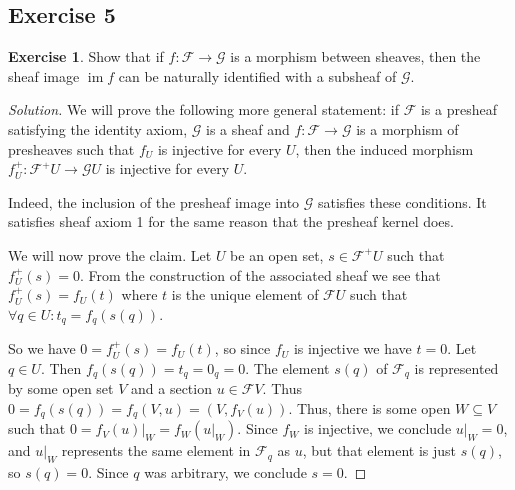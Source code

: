 \documentclass[a4paper]{amsbook}
\theoremstyle{definition}
\newtheorem*{exercise*}{Exercise}
\DeclareMathOperator\im{im}
\begin{document}
\subsection*{Exercise 5}
\label{Ex5}
\begin{exercise*}
\label{Exercise5}
Show that if $f\colon \mathcal{F}\to \mathcal{G}$ is a morphism between sheaves,
then the sheaf image $\im f$ can be naturally identified with a subsheaf of
$\mathcal{G}$.
\end{exercise*}
\begin{proof}[Solution]
We will prove the following more general statement: if $\mathcal{F}$ is a presheaf
satisfying the identity axiom, $\mathcal{G}$ is a sheaf and $f\colon \mathcal{F}\to \mathcal{G}$
is a morphism of presheaves such that $f_U$ is injective for every $U$, then the induced
morphism $f^+_U\colon \mathcal{F}^+U\to \mathcal{G}U$ is injective for every $U$.

Indeed, the inclusion of the presheaf image into $\mathcal{G}$ satisfies these conditions.
It satisfies sheaf axiom 1 for the same reason that the presheaf kernel does.

We will now prove the claim. Let $U$ be an open set, $s \in \mathcal{F}^+U$ such that
$f^+_U(s) = 0$. From the construction of the associated sheaf we see that
$f^+_U(s) = f_U(t)$ where $t$ is the unique element of $\mathcal{F}U$ such that
$\forall q \in U\colon t_q = f_q(s(q))$.

So we have $0 = f^+_U(s) = f_U(t)$, so since $f_U$ is injective we have $t = 0$.
Let $q \in U$. Then $f_q(s(q)) = t_q = 0_q = 0$. The element $s(q)$ of $\mathcal{F}_q$
is represented by some open set $V$ and a section $u \in \mathcal{F}V$. Thus
$0 = f_q(s(q)) = f_q(V, u) = (V, f_V(u))$. Thus, there is some open $W \subseteq V$
such that $0 = f_V(u)|_W = f_W(u|_W)$. Since $f_W$ is injective, we conclude
$u|_W = 0$, and $u|_W$ represents the same element in $\mathcal{F}_q$ as $u$,
but that element is just $s(q)$, so $s(q) = 0$. Since $q$ was arbitrary, we
conclude $s = 0$.
\end{proof}
\end{document}
